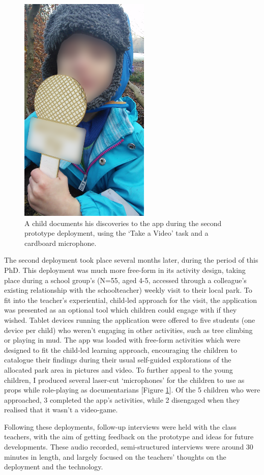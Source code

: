 \begin{figure}
  \centering
  \includegraphics[width=0.35\columnwidth]{images/chapter04/microphone.png}
  \caption[A child completing a `Take a Video' Task]{A child documents his discoveries to the app during the second prototype deployment, using the `Take a Video' task and a cardboard microphone.}
  \label{fig:prototypeMicrophone}
\end{figure}

The second deployment took place several months later, during the period of this PhD. This deployment was much more free-form in its activity design, taking place during a school group’s (N=55, aged 4-5, accessed through a colleague's existing relationship with the schoolteacher) weekly visit to their local park. To fit into the teacher’s experiential, child-led approach for the visit, the application was presented as an optional tool which children could engage with if they wished. Tablet devices running the application were offered to five students (one device per child) who weren't engaging in other activities, such as tree climbing or playing in mud. The app was loaded with free-form activities which were designed to fit the child-led learning approach, encouraging the children to catalogue their findings during their usual self-guided explorations of the allocated park area in pictures and video. To further appeal to the young children, I produced several laser-cut `microphones' for the children to use as props while role-playing as documentarians [Figure \ref{fig:prototypeMicrophone}]. Of the 5 children who were approached, 3 completed the app’s activities, while 2 disengaged when they realised that it wasn't a video-game.

Following these deployments, follow-up interviews were held with the class teachers, with the aim of getting feedback on the prototype and ideas for future developments. These audio recorded, semi-structured interviews were around 30 minutes in length, and largely focused on the teachers' thoughts on the deployment and the technology.

